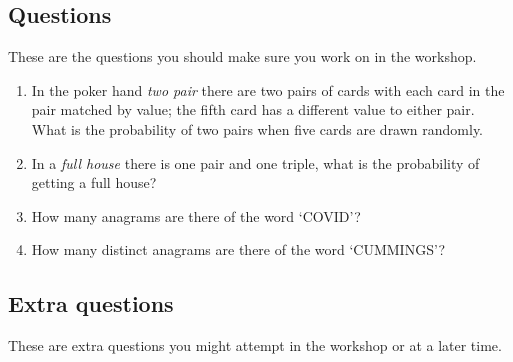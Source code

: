 \documentclass[11pt,a4paper]{scrartcl}
\begin{document}
\subsection*{Questions}

These are the questions you should make sure you work on in the workshop.

\begin{enumerate}

\item In the poker hand \textsl{two pair} there are two pairs of cards
  with each card in the pair matched by value; the fifth card has a
  different value to either pair. What is the probability of two pairs
  when five cards are drawn randomly.


\item In a \textsl{full house} there is one
  pair and one triple, what is the probability of getting a full
  house?

\item How many anagrams are there of the word `COVID'?

\item How many distinct anagrams are there of the word `CUMMINGS'?
  
\end{enumerate}

\subsection*{Extra questions}

These are extra questions you might attempt in the workshop or at a later time.
\end{document}
